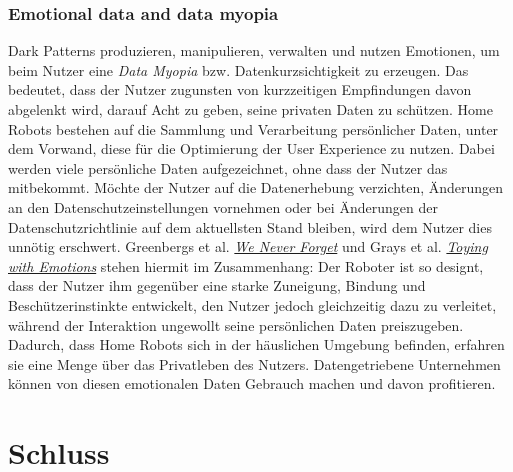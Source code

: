 \documentclass[a4paper]{article}
\begin{document}
\subsubsection{Emotional data and data myopia}
Dark Patterns produzieren, manipulieren, verwalten und nutzen Emotionen, um beim Nutzer eine \textit{Data Myopia} bzw. Datenkurzsichtigkeit zu erzeugen. Das bedeutet, dass der Nutzer zugunsten von kurzzeitigen Empfindungen davon abgelenkt wird, darauf Acht zu geben, seine privaten Daten zu schützen.\newline
Home Robots bestehen auf die Sammlung und Verarbeitung persönlicher Daten, unter dem Vorwand, diese für die Optimierung der User Experience zu nutzen. Dabei werden viele persönliche Daten aufgezeichnet, ohne dass der Nutzer das mitbekommt. Möchte der Nutzer auf die Datenerhebung verzichten, Änderungen an den Datenschutzeinstellungen vornehmen oder bei Änderungen der Datenschutzrichtlinie auf dem aktuellsten Stand bleiben, wird dem Nutzer dies unnötig erschwert.\newline
Greenbergs et al. \hyperref[sssec:we_never_forget]{\textit{We Never Forget}} und Grays et al. \hyperref[subpara:toying_with_emotions]{\textit{Toying with Emotions}} stehen hiermit im Zusammenhang: Der Roboter ist so designt, dass der Nutzer ihm gegenüber eine starke Zuneigung, Bindung und Beschützerinstinkte entwickelt, den Nutzer jedoch gleichzeitig dazu zu verleitet, während der Interaktion ungewollt seine persönlichen Daten preiszugeben. Dadurch, dass Home Robots sich in der häuslichen Umgebung befinden, erfahren sie eine Menge über das Privatleben des Nutzers. Datengetriebene Unternehmen können von diesen emotionalen Daten Gebrauch machen und davon profitieren.

\newpage

\section{Schluss}
\label{sec:schluss}
\end{document}
